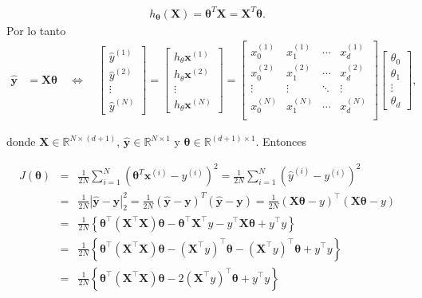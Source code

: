 \documentclass[12pt]{article}
\begin{document}
\begin{eqnarray*}
h_{\mathbf{\theta}}(\mathbf{X}) = \mathbf{\theta}^{T} \mathbf{X} = \mathbf{X}^{T} \mathbf{\theta}.
\end{eqnarray*}
Por lo tanto
\begin{eqnarray}
\hat{\textbf{y}} &= \mathbf{X} \mathbf{\theta} \quad \Leftrightarrow \quad 
\begin{bmatrix}
\hat{y}^{(1)} \\
\hat{y}^{(2)} \\
\vdots \\
\hat{y}^{(N)}
\end{bmatrix} =
\begin{bmatrix}
h_{\theta}\mathbf{x}^{(1)} \\
h_{\theta}\mathbf{x}^{(2)} \\
\vdots \\
h_{\theta}\mathbf{x}^{(N)}
\end{bmatrix}= 
\begin{bmatrix}
x_0^{(1)} & x_1^{(1)} & \cdots & x_d^{(1)} \\
x_0^{(2)} & x_1^{(2)} & \cdots & x_d^{(2)} \\
\vdots & \vdots & \ddots & \vdots \\
x_0^{(N)} & x_1^{(N)} & \cdots & x_d^{(N)} \\
\end{bmatrix}
\begin{bmatrix}
\theta_0 \\
\theta_1 \\
\vdots \\
\theta_d
\end{bmatrix},
\end{eqnarray}

donde $\mathbf{X} \in \mathbb{R}^{N \times (d+1)}$, $\hat{\mathbf{y}} \in \mathbb{R}^{N \times 1}$ y $\mathbf{\theta} \in \mathbb{R}^{(d+1) \times 1}$. Entonces

\begin{eqnarray*}
J(\mathbf{\theta}) &=& \frac{1}{2N} \sum_{i=1}^{N} \left( \mathbf{\theta}^{T} \mathbf{x}^{(i)} - y^{(i)} \right)^2 = \frac{1}{2N} \sum_{i=1}^{N} \left( \hat{y}^{(i)} - y^{(i)} \right)^2\\
&=& \frac{1}{2N} | \hat{\mathbf{y}} - \mathbf{y} |_2^2 = \frac{1}{2N} (\hat{\mathbf{y}} - \mathbf{y})^{T} (\hat{\mathbf{y}} - \mathbf{y})=\frac{1}{2N}\left(\mathbf{X}\mathbf{\theta}-y\right)^{\top}\left(\mathbf{X}\mathbf{\theta}-y\right)\\
&=&\frac{1}{2N}\left\{\mathbf{\theta}^{\top}\left(\mathbf{X}^{\top}\mathbf{X}\right)\mathbf{\theta}-\mathbf{\theta}^{\top}\mathbf{X}^{\top}y-y^{\top}\mathbf{X}\mathbf{\theta}+y^{\top}y\right\}\\
&=&\frac{1}{2N}\left\{\mathbf{\theta}^{\top}\left(\mathbf{X}^{\top}\mathbf{X}\right)\mathbf{\theta}-\left(\mathbf{X}^{\top}y\right)^{\top}\mathbf{\theta}-\left(\mathbf{X}^{\top}y\right)^{\top}\mathbf{\theta}+y^{\top}y\right\}\\
&=&\frac{1}{2N}\left\{\mathbf{\theta}^{\top}\left(\mathbf{X}^{\top}\mathbf{X}\right)\mathbf{\theta}-2\left(\mathbf{X}^{\top}y\right)^{\top}\mathbf{\theta}+y^{\top}y\right\}
\end{eqnarray*}
\end{document}
